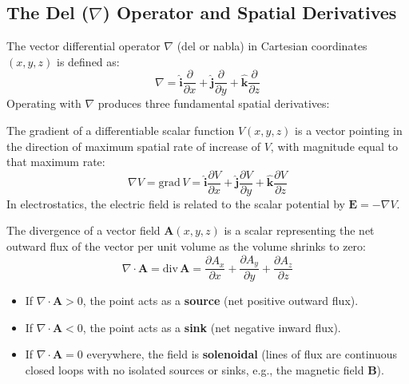 \subsection{The Del (\texorpdfstring{$\nabla$}{Del}) Operator and Spatial Derivatives}
The vector differential operator $\nabla$ (del or nabla) in Cartesian coordinates $(x, y, z)$ is defined as:
\begin{equation}
    \nabla = \hat{\mathbf{i}} \frac{\partial}{\partial x} + \hat{\mathbf{j}} \frac{\partial}{\partial y} + \hat{\mathbf{k}} \frac{\partial}{\partial z}
\end{equation}
Operating with $\nabla$ produces three fundamental spatial derivatives:

\begin{definition}
The gradient of a differentiable scalar function $V(x, y, z)$ is a vector pointing in the direction of maximum spatial rate of increase of $V$, with magnitude equal to that maximum rate:
\begin{equation}
    \nabla V = \text{grad}\,V = \hat{\mathbf{i}} \frac{\partial V}{\partial x} + \hat{\mathbf{j}} \frac{\partial V}{\partial y} + \hat{\mathbf{k}} \frac{\partial V}{\partial z}
\end{equation}
In electrostatics, the electric field is related to the scalar potential by $\mathbf{E} = -\nabla V$.
\end{definition}

\begin{definition}
The divergence of a vector field $\mathbf{A}(x,y,z)$ is a scalar representing the net outward flux of the vector per unit volume as the volume shrinks to zero:
\begin{equation}
    \nabla \cdot \mathbf{A} = \text{div}\,\mathbf{A} = \frac{\partial A_x}{\partial x} + \frac{\partial A_y}{\partial y} + \frac{\partial A_z}{\partial z}
\end{equation}
\begin{itemize}
    \item If $\nabla \cdot \mathbf{A} > 0$, the point acts as a \textbf{source} (net positive outward flux).
    \item If $\nabla \cdot \mathbf{A} < 0$, the point acts as a \textbf{sink} (net negative inward flux).
    \item If $\nabla \cdot \mathbf{A} = 0$ everywhere, the field is \textbf{solenoidal} (lines of flux are continuous closed loops with no isolated sources or sinks, e.g., the magnetic field $\mathbf{B}$).
\end{itemize}
\end{definition}

